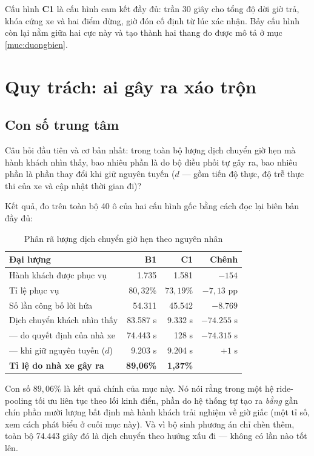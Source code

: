 Cấu hình \textbf{C1} là cấu hình cam kết đầy đủ: trần 30 giây cho tổng độ dời giờ trả, khóa cứng
xe và hai điểm dừng, giờ đón cố định từ lúc xác nhận. Bảy cấu hình còn lại nằm giữa hai cực này
và tạo thành hai thang đo được mô tả ở mục \ref{muc:duongbien}.

\section{Quy trách: ai gây ra xáo trộn}
\label{muc:quytrach}

\subsection{Con số trung tâm}

Câu hỏi đầu tiên và cơ bản nhất: trong toàn bộ lượng dịch chuyển giờ hẹn mà hành khách nhìn
thấy, bao nhiêu phần là do bộ điều phối tự gây ra, bao nhiêu phần là phần thay đổi khi giữ nguyên
tuyến ($d$ --- gồm tiến độ thực, độ trễ thực thi của xe và cập nhật thời gian đi)?

Kết quả, đo trên toàn bộ 40 ô của hai cấu hình gốc bằng cách đọc lại biên bản đầy đủ:

\begin{table}[htbp]
\centering
\caption{Phân rã lượng dịch chuyển giờ hẹn theo nguyên nhân}
\label{bang:quytrach}
\small
\begin{tabular}{@{}lrrr@{}}
\toprule
\textbf{Đại lượng} & \textbf{B1} & \textbf{C1} & \textbf{Chênh}\\
\midrule
Hành khách được phục vụ & 1.735 & 1.581 & $-154$\\
Tỉ lệ phục vụ & $80{,}32\%$ & $73{,}19\%$ & $-7{,}13$ pp\\
Số lần công bố lời hứa & 54.311 & 45.542 & $-8.769$\\
\midrule
Dịch chuyển khách nhìn thấy & 83.587 s & 9.332 s & $-74.255$ s\\
\quad --- do quyết định của nhà xe & 74.443 s & 128 s & $-74.315$ s\\
\quad --- khi giữ nguyên tuyến ($d$) & 9.203 s & 9.204 s & $+1$ s\\
\midrule
\textbf{Tỉ lệ do nhà xe gây ra} & \textbf{89{,}06\%} & \textbf{1{,}37\%} & \\
\bottomrule
\end{tabular}
\end{table}

Con số $89{,}06\%$ là kết quả chính của mục này. Nó nói rằng trong một hệ ride-pooling tối ưu
liên tục theo lối kinh điển, phần do hệ thống tự tạo ra \emph{bằng} gần chín phần mười lượng bất
định mà hành khách trải nghiệm về giờ giấc (một tỉ số, xem cách phát biểu ở cuối mục này). Và vì
bộ sinh phương án
chỉ chèn thêm, toàn bộ 74.443 giây đó là dịch chuyển theo hướng xấu đi --- không có lần nào
tốt lên.


